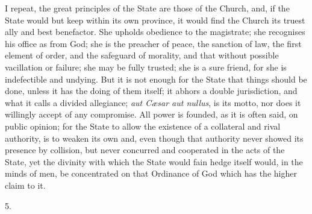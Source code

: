 I repeat, the great principles of the State are those of the
Church, and, if the State would but keep within its own province, it
would find the Church its truest ally and best benefactor. She upholds
obedience to the magistrate; she recognises his office as from God;
she is the preacher of peace, the sanction of law, the first element
of order, and the safeguard of morality, and that without possible
vacillation or failure; she may be fully trusted; she is a sure
friend, for she is indefectible and undying. But it is not enough for
the State that things should be done, unless it has the doing of them
itself; it abhors a double jurisdiction, and what it calls a divided
allegiance; \emph{aut Cæsar aut nullus}, is its motto, nor does it
willingly accept of any compromise. All power is founded, as it is
often said, on public opinion; for the State to allow the existence of
a collateral and rival authority, is to weaken its own and, even
though that authority never showed its presence by collision, but
never concurred and cooperated in the acts of the State, yet the
divinity with which the State would fain hedge itself would, in the
minds of men, be concentrated on that Ordinance of God which has the
higher claim to it.

5.

